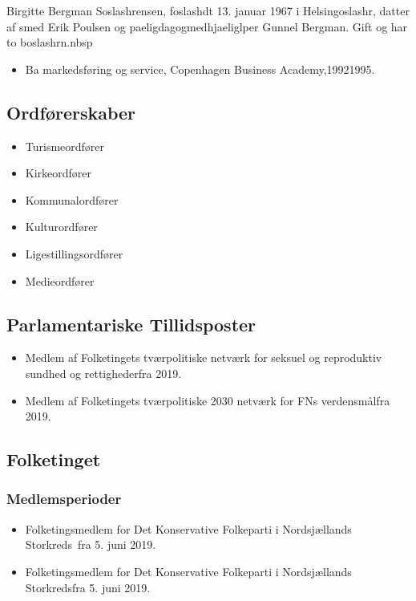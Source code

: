 \documentclass[11pt, a4paper]{awesome-cv}
\begin{document}
\makecvheader[R]
\makelettertitle
\begin{cvletter}
Birgitte Bergman Soslashrensen, foslashdt 13. januar 1967 i Helsingoslashr, datter af smed Erik Poulsen og paeligdagogmedhjaeliglper Gunnel Bergman. Gift og har to boslashrn.nbsp

\begin{itemize}
\item Ba markedsføring og service, Copenhagen Business Academy,19921995.
\end{itemize}
\subsection*{Ordførerskaber}
\begin{itemize}
\item Turismeordfører
\item Kirkeordfører
\item Kommunalordfører
\item Kulturordfører
\item Ligestillingsordfører
\item Medieordfører
\end{itemize}
\subsection*{Parlamentariske Tillidsposter}
\begin{itemize}
\item Medlem af Folketingets tværpolitiske netværk for seksuel og reproduktiv sundhed og rettighederfra 2019.
\item Medlem af Folketingets tværpolitiske 2030 netværk for FNs verdensmålfra 2019.
\end{itemize}
\subsection*{Folketinget}
\subsubsection*{Medlemsperioder}
\begin{itemize}
\item Folketingsmedlem for Det Konservative Folkeparti i Nordsjællands Storkreds fra 5. juni 2019.
\item Folketingsmedlem for Det Konservative Folkeparti i Nordsjællands Storkredsfra 5. juni 2019.
\end{itemize}

\end{cvletter}
\end{document}
